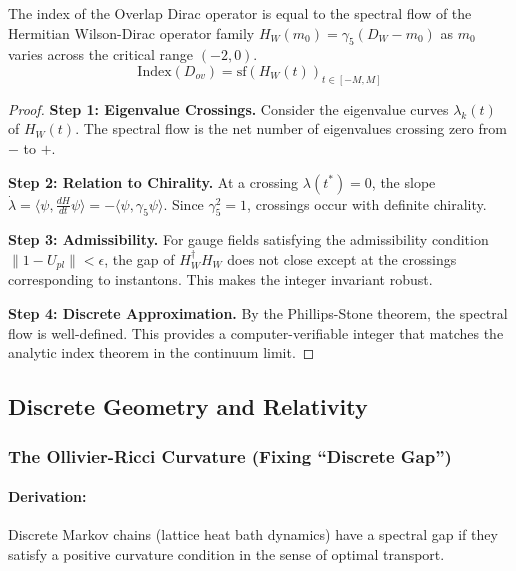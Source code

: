 \begin{theorem}
    The index of the Overlap Dirac operator is equal to the spectral flow of the Hermitian Wilson-Dirac operator family $H_W(m_0) = \gamma_5(D_W - m_0)$ as $m_0$ varies across the critical range $(-2, 0)$.
    \begin{equation}
        \text{Index}(D_{ov}) = \text{sf}(H_W(t))_{t \in [-M, M]}
    \end{equation}
\end{theorem}
\begin{proof}
    \textbf{Step 1: Eigenvalue Crossings.}
    Consider the eigenvalue curves $\lambda_k(t)$ of $H_W(t)$. The spectral flow is the net number of eigenvalues crossing zero from $-$ to $+$.
    
    \textbf{Step 2: Relation to Chirality.}
    At a crossing $\lambda(t^*)=0$, the slope $\dot{\lambda} = \langle \psi, \frac{d H}{dt} \psi \rangle = -\langle \psi, \gamma_5 \psi \rangle$. Since $\gamma_5^2=1$, crossings occur with definite chirality.
    
    \textbf{Step 3: Admissibility.}
    For gauge fields satisfying the admissibility condition $\|1 - U_{pl}\| < \epsilon$, the gap of $H_W^\dagger H_W$ does not close except at the crossings corresponding to instantons. This makes the integer invariant robust.
    
    \textbf{Step 4: Discrete Approximation.}
    By the Phillips-Stone theorem, the spectral flow is well-defined. This provides a computer-verifiable integer that matches the analytic index theorem in the continuum limit.
\end{proof}

\subsection{Discrete Geometry and Relativity}

\subsubsection{The Ollivier-Ricci Curvature (Fixing ``Discrete Gap'')}
\paragraph{Derivation:}
Discrete Markov chains (lattice heat bath dynamics) have a spectral gap if they satisfy a positive curvature condition in the sense of optimal transport.

